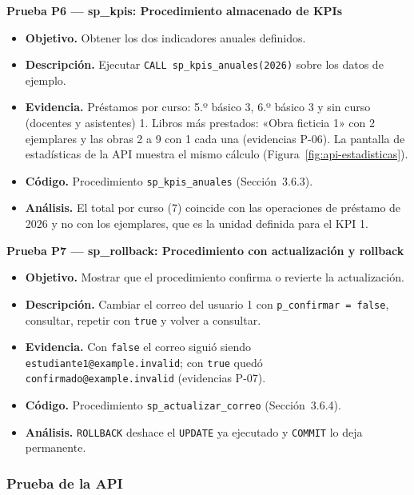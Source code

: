 \documentclass[11pt,a4paper]{article}
\begin{document}
\textbf{Prueba P6 --- sp\_kpis: Procedimiento almacenado de KPIs}
\begin{itemize}[nosep]
\item \textbf{Objetivo.} Obtener los dos indicadores anuales definidos.
\item \textbf{Descripción.} Ejecutar \texttt{CALL sp\_kpis\_anuales(2026)} sobre los datos de ejemplo.
\item \textbf{Evidencia.} Préstamos por curso: 5.º básico 3, 6.º básico 3 y sin curso (docentes y asistentes) 1. Libros más prestados: «Obra ficticia 1» con 2 ejemplares y las obras 2 a 9 con 1 cada una (evidencias P-06). La pantalla de estadísticas de la API muestra el mismo cálculo (Figura~\ref{fig:api-estadisticas}).
\item \textbf{Código.} Procedimiento \texttt{sp\_kpis\_anuales} (Sección~3.6.3).
\item \textbf{Análisis.} El total por curso (7) coincide con las operaciones de préstamo de 2026 y no con los ejemplares, que es la unidad definida para el KPI 1.
\end{itemize}

\textbf{Prueba P7 --- sp\_rollback: Procedimiento con actualización y rollback}
\begin{itemize}[nosep]
\item \textbf{Objetivo.} Mostrar que el procedimiento confirma o revierte la actualización.
\item \textbf{Descripción.} Cambiar el correo del usuario 1 con \texttt{p\_confirmar = false}, consultar, repetir con \texttt{true} y volver a consultar.
\item \textbf{Evidencia.} Con \texttt{false} el correo siguió siendo \texttt{estudiante1@example.invalid}; con \texttt{true} quedó \texttt{confirmado@example.invalid} (evidencias P-07).
\item \textbf{Código.} Procedimiento \texttt{sp\_actualizar\_correo} (Sección~3.6.4).
\item \textbf{Análisis.} \texttt{ROLLBACK} deshace el \texttt{UPDATE} ya ejecutado y \texttt{COMMIT} lo deja permanente.
\end{itemize}

\subsubsection{Prueba de la API}
\end{document}
